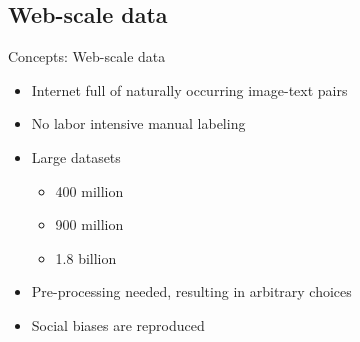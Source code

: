 \documentclass[xcolor=dvipsnames]{beamer}
\begin{document}
\subsection{Web-scale data} %
\begin{frame}{Concepts: Web-scale data}
  \begin{itemize}
    \item Internet full of naturally occurring image-text pairs
    \item No labor intensive manual labeling
    \item Large datasets
      \begin{itemize}
        \item 400 million \parencite[CLIP;][]{radford2021learning}
        \item 900 million \parencite[Florence;][]{yuan2021florence}
        \item 1.8 billion \parencite[ALIGN;][]{jia2021scaling}
      \end{itemize}
    \item Pre-processing needed, resulting in arbitrary choices
    \item Social biases are reproduced
  \end{itemize}
\end{frame}
\end{document}
